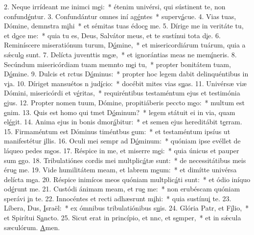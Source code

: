 2. Neque irrídeant me inimci m\uline{e}i:~* étenim univérsi, qui sústinent te, non confund\uline{é}ntur.
3. Confundántur omnes iní ag\uline{é}ntes~* superv\uline{á}cue.
4. Vias tuas, Dómine, demnstra m\uline{i}hi~* et sémitas tuas édoc\uline{e} me.
5. Dírige me in veritáte tu, et d\uline{o}ce me:~* quia tu es, Deus, Salvátor meus, et te sustínui tota d\uline{i}e.
6. Reminíscere miseratiónum turum, D\uline{ó}mine,~* et misericordiárum tuárum, quia a sǽcul\uline{o} sunt.
7. Delícta juventtis m\uline{e}æ,~* et ignorántias meas ne mem\uline{í}neris.
8. Secúndum misericórdiam tuam memnto m\uline{e}i tu,~* propter bonitátem tuam, D\uline{ó}mine.
9. Dulcis et rctus D\uline{ó}minus:~* propter hoc legem dabit delinquéntibus in v\uline{i}a.
10. Díriget mansuétos n jud\uline{í}cio:~* docébit mites vias s\uline{u}as.
11. Univérsæ viæ Dómini, misericórdi et v\uline{é}ritas,~* requiréntibus testaméntum ejus et testimónia \uline{e}jus.
12. Propter nomen tuum, Dómine, propitiáberis peccto m\uline{e}o:~* multum est \uline{e}nim.
13. Quis est homo qui tmet D\uline{ó}minum?~* legem státuit ei in via, quam el\uline{é}git.
14. Anima ejus in bonis dmor\uline{á}bitur:~* et semen ejus hereditábit t\uline{e}rram.
15. Firmaméntum est Dóminus timéntbus \uline{e}um:~* et testaméntum ipsíus ut manifestétur \uline{i}llis.
16. Oculi mei sempr ad D\uline{ó}minum:~* quóniam ipse evéllet de láqueo pedes m\uline{e}os.
17. Réspice in me, et miserre m\uline{e}i:~* quia únicus et pauper sum \uline{e}go.
18. Tribulatiónes cordis mei multplic\uline{á}tæ sunt:~* de necessitátibus meis éru\uline{e} me.
19. Vide humilitátem meam, et labrem m\uline{e}um:~* et dimítte univérsa delícta m\uline{e}a.
20. Réspice inimícos meos quóniam multplic\uline{á}ti sunt:~* et ódio iníquo od\uline{é}runt me.
21. Custódi ánimam meam, et ru\uline{e} me:~* non erubéscam quóniam sperávi \uline{i}n te.
22. Innocéntes et recti adhæsrunt m\uline{i}hi:~* quia sustínu\uline{i} te.
23. Líbera, Dus, \uline{I}sraël:~* ex ómnibus tribulatiónibus s\uline{u}is.
24. Glória Patr, et F\uline{í}lio,~* et Spirítui S\uline{a}ncto.
25. Sicut erat in princípio, et nnc, et s\uline{e}mper,~* et in sǽcula sæculórum. \uline{A}men.
